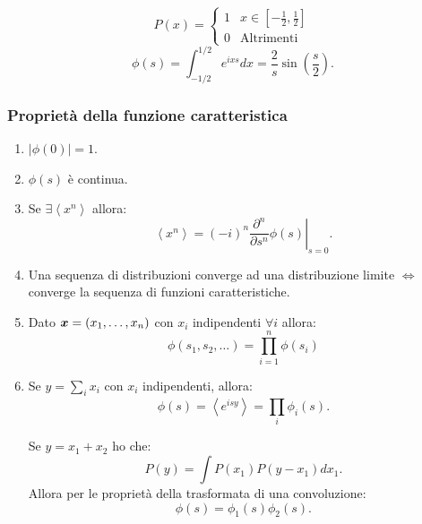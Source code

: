 \begin{exmp}
\[
    P(x) = 
    \begin{cases}
	1 & x \in \left[-\frac{1}{2}, \frac{1}{2}\right]\\
	0 & \text{Altrimenti}
    \end{cases}
\] 
\[
    \phi (s) = \int_{-1 /2}^{1 /2} e^{ixs}dx = \frac{2}{s}\sin\left(\frac{s}{2}\right)  
.\] 
\end{exmp}

\subsubsection{Proprietà della funzione caratteristica}%
\label{ssub:Proprietà della funzione caratteristica}
\begin{enumerate}
    \item $\left|\phi (0) \right|= 1 $.
    \item $\phi (s) $ è continua.
    \item Se $\exists \left<x^n\right>$ allora: 
	\[
		\left<x^n\right> = \left(-i\right)^n \left.\frac{\partial ^n}{\partial s^n} \phi (s)\right|_{s=0} 
	.\] 
    \item Una sequenza di distribuzioni converge ad una distribuzione limite $\iff$ converge la sequenza di funzioni caratteristiche.
    \item Dato $\boldsymbol{x} = \left(x_1, \ldots, x_n\right)$ con $x_i$ indipendenti $\forall i$ allora:
	\[ 
	    \phi (s_1, s_2, \ldots) = \prod_{i=1}^{n} \phi (s_i)  
	\]
    \item Se $y = \sum_{i}^{} x_i$ con $x_i$ indipendenti, allora:
	\[
	    \phi (s) = \left<e^{isy}\right> = \prod_{i}^{} \phi_i(s)  
	.\] 
	\begin{exmp}
	    Se $y = x_1 + x_2$ ho che:
	    \[
		P(y) = \int P(x_1) P(y-x_1) dx_1
	    .\] 
	    Allora per le proprietà della trasformata di una convoluzione:
	    \[
		\phi (s) = \phi_1(s) \phi_2(s) 
	    .\] 
	\end{exmp}
\end{enumerate}
